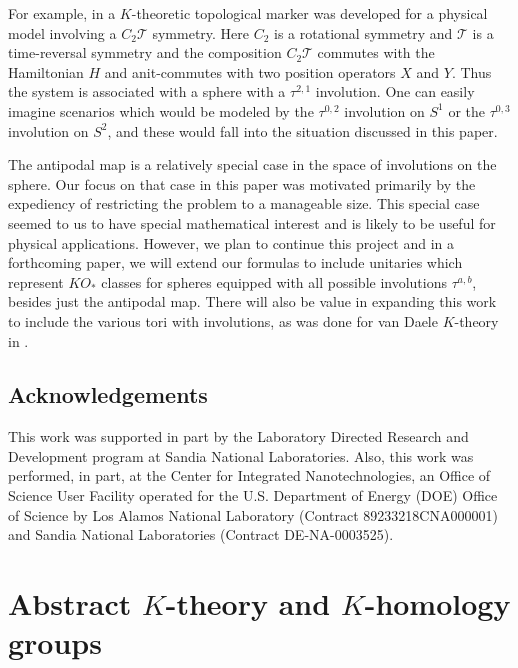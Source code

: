 \documentclass[12pt, reqno]{amsart}
\theoremstyle{definition}
\begin{document}
For example, in \cite{Li...2025} a $K$-theoretic topological marker was developed for a physical model involving a $C_2 \mathcal{T}$ symmetry.  Here $C_2$ is a rotational symmetry and $\mathcal{T}$ is a time-reversal symmetry and the composition $C_2 \mathcal{T}$ commutes with the Hamiltonian $H$ and anit-commutes with two position operators $X$ and $Y$. Thus the system is associated with a sphere with a $\tau^{2,1}$ involution. One can easily imagine scenarios which would be modeled by the $\tau^{0,2}$ involution on $S^1$ or the $\tau^{0,3}$ involution on $S^2$, and these would fall into the situation discussed in this paper. 

The antipodal map is a relatively special case in the space of involutions on the sphere. Our focus on that case in this paper was motivated primarily by the expediency of restricting the problem to a manageable size. This special case seemed to us to have special mathematical interest and is likely to be useful for physical applications. However, we plan to continue this project and in a forthcoming paper, we will extend our formulas to include unitaries which represent $KO_*$ classes for spheres equipped with all possible involutions $\tau^{a,b}$, besides just the antipodal map. There will also be value in expanding this work to include the various tori with involutions, as was done for van Daele $K$-theory in \cite{JosephMeyer}.

\subsection{Acknowledgements}

This work was supported in part by the Laboratory Directed Research and Development program at Sandia National Laboratories.
Also, this work was performed, in part, at the Center for Integrated Nanotechnologies, an Office of Science User Facility operated for the U.S. Department of Energy (DOE) Office of Science by Los Alamos National Laboratory (Contract 89233218CNA000001) and Sandia National Laboratories (Contract DE-NA-0003525).

\section{Abstract $K$-theory and $K$-homology groups}
\end{document}

